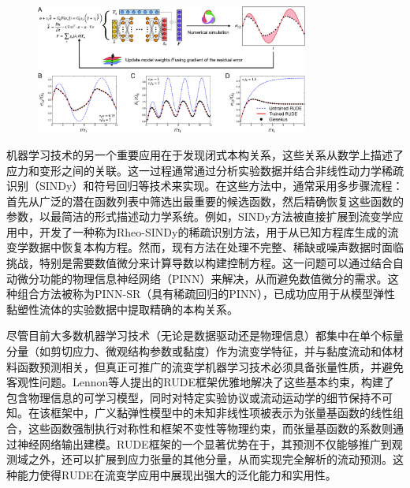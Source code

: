 \begin{figure}[htbp]
  \centering
  \includegraphics[width=0.8\textwidth]{Fig/pnas.2304669120fig01.jpg}
\end{figure}
机器学习技术的另一个重要应用在于发现闭式本构关系，这些关系从数学上描述了应力和变形之间的关联。这一过程通常通过分析实验数据并结合非线性动力学稀疏识别（SINDy）和符号回归等技术来实现\cite{Sato2025}。在这些方法中，通常采用多步骤流程：首先从广泛的潜在函数列表中筛选出最重要的候选函数，然后精确恢复这些函数的参数，以最简洁的形式描述动力学系统。例如，SINDy方法被直接扩展到流变学应用中，开发了一种称为Rheo-SINDy的稀疏识别方法，用于从已知方程库生成的流变学数据中恢复本构方程。然而，现有方法在处理不完整、稀缺或噪声数据时面临挑战，特别是需要数值微分来计算导数以构建控制方程\cite{mahmoudabadbozchelouUnbiasedConstructionConstitutive2024}。这一问题可以通过结合自动微分功能的物理信息神经网络（PINN）来解决，从而避免数值微分的需求。这种组合方法被称为PINN-SR（具有稀疏回归的PINN），已成功应用于从模型弹性黏塑性流体的实验数据中提取精确的本构关系。

尽管目前大多数机器学习技术（无论是数据驱动还是物理信息）都集中在单个标量分量（如剪切应力、微观结构参数或黏度）作为流变学特征，并与黏度流动和体材料函数预测相关，但真正可推广的流变学机器学习技术必须具备张量性质，并避免客观性问题。Lennon等人提出的RUDE框架优雅地解决了这些基本约束，构建了包含物理信息的可学习模型，同时对特定实验协议或流动运动学的细节保持不可知\cite{lennonScientificMachineLearning2023a}。在该框架中，广义黏弹性模型中的未知非线性项被表示为张量基函数的线性组合，这些函数强制执行对称性和框架不变性等物理约束，而张量基函数的系数则通过神经网络输出建模。RUDE框架的一个显著优势在于，其预测不仅能够推广到观测域之外，还可以扩展到应力张量的其他分量，从而实现完全解析的流动预测。这种能力使得RUDE在流变学应用中展现出强大的泛化能力和实用性。
